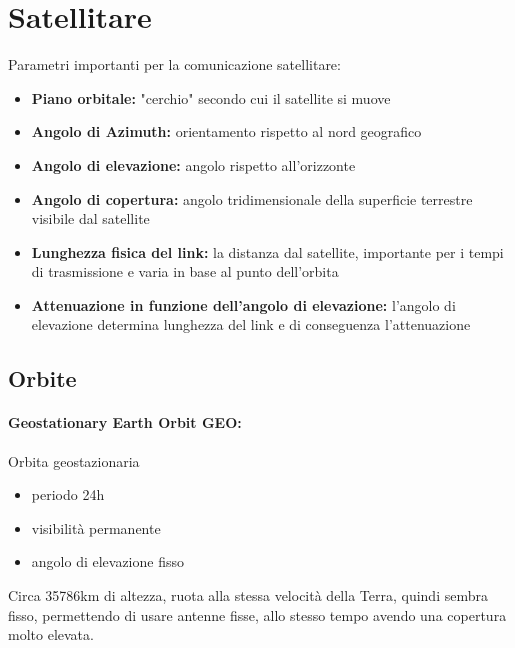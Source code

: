 \section{Satellitare}

Parametri importanti per la comunicazione satellitare: 
\begin{itemize}
    \item \textbf{Piano orbitale:} "cerchio" secondo cui il satellite si muove
    
    \item \textbf{Angolo di Azimuth:} orientamento rispetto al nord geografico
    
    \item \textbf{Angolo di elevazione:} angolo rispetto all'orizzonte
    
    \item \textbf{Angolo di copertura:} angolo tridimensionale della superficie terrestre visibile dal satellite
    
    \item \textbf{Lunghezza fisica del link:} la distanza dal satellite, importante per i tempi di trasmissione e varia in base al punto dell'orbita
    
    \item \textbf{Attenuazione in funzione dell'angolo di elevazione:} l'angolo di elevazione determina lunghezza del link e di conseguenza l'attenuazione
\end{itemize}

\subsection{Orbite}

\paragraph{Geostationary Earth Orbit GEO:} Orbita geostazionaria
\begin{itemize}
    \item periodo 24h 
    
    \item visibilità permanente
    
    \item angolo di elevazione fisso
\end{itemize}

Circa 35786km di altezza, ruota alla stessa velocità della Terra, quindi sembra fisso, permettendo di usare antenne fisse, allo stesso tempo avendo una copertura molto elevata. 

